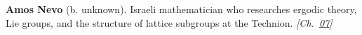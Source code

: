 \textbf{Amos Nevo} (b. unknown). Israeli mathematician who researches ergodic theory, Lie groups, and the structure of lattice subgroups at the Technion. \emph{[Ch.~\hyperref[ch:billiardsconicsporism]{07}]}

